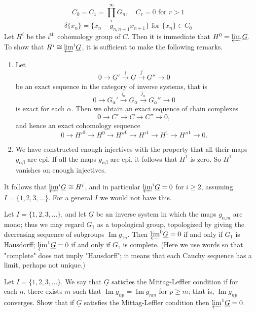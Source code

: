 \documentclass[../main]{subfiles}
\begin{document}
$$C_0=C_1=\prod_i^\infty G_n,\quad C_r=0 \text{ for } r>1 $$ 
$$\delta\{x_n\}=\{x_n-g_{n,n+1}x_{n+1}\} \text{ for } \{x_n\}\in C_0$$
Let $H^i$ be the $i^\text{th}$ cohomology group of $C$. Then it is immediate that $H^0=\varprojlim\underline{G}$. To show that $H^i\cong{\varprojlim}^i\underline{G}$, it is sufficient to make the following remarks.
\begin{enumerate}[wide=\parindent]
    \item Let $$0\longrightarrow \underline{G}'\overset{i}{\longrightarrow}\underline{G}\overset{j}{\longrightarrow}\underline{G}''\longrightarrow 0$$ be an exact sequence in the category of inverse systems, that is \\ $$0\longrightarrow G_\alpha'\overset{i_\alpha}{\longrightarrow}G_\alpha\overset{j_\alpha}{\longrightarrow}G_\alpha''\longrightarrow 0$$ is exact for each $\alpha$. Then we obtain an exact sequence of chain complexes
    $$0\longrightarrow C'\longrightarrow C\longrightarrow C'' \longrightarrow 0,$$
    and hence an exact cohomology sequence
    $$0\longrightarrow {H'}^0\longrightarrow H^0\longrightarrow {H''}^0 \longrightarrow {H'}^1 \longrightarrow H^1 \longrightarrow {H''}^1 \longrightarrow 0.$$
    \item We have constructed enough injectives with the property that all their maps $g_{\alpha\beta}$ are epi. If all the maps $g_{\alpha\beta}$ are epi, it follows that $H^1$ is zero. So $H^1$ vanishes on enough injectives.
\end{enumerate}
\par It follows that ${\varprojlim}^i \underline{G}\cong H^i$, and in particular ${\varprojlim}^i\underline{G}=0$ for $i\geq 2$, assuming $I=\{1,2,3,...\}$. For a general $I$ we would not have this.
\begin{exercise} \label{ex:p3ch08.i}
Let $I=\{1,2,3,...\}$, and let $\underline{G}$ be an inverse system in which the maps $g_{n.m}$ are mono; thus we may regard $G_1$ as a topological group, topologized by giving the decreasing sequence of subgroups $\operatorname{Im}g_{1n}$. Then ${\varprojlim}^0\underline{G}=0$ if and only if $G_1$ is Hausdorff; ${\varprojlim}^1\underline{G}=0$ if and only if $G_1$ is complete. (Here we use words so that "complete" does not imply "Hausdorff"; it means that each Cauchy sequence has a limit, perhaps not unique.)
\end{exercise}
\begin{exercise} \label{ex:p3ch08.ii}
Let $I=\{1,2,3,...\}$. We say that $\underline{G}$ satisfies the Mittag-Leffler condition if for each $n$, there exists $m$ such that $\operatorname{Im}g_{np}=\operatorname{Im}g_{nm}$ for $p\geq m$; that is, $\operatorname{Im}g_{np}$ converges. Show that if $\underline{G}$ satisfies the Mittag-Leffler condition then ${\varprojlim}^1\underline{G}=0$.
\end{exercise} 
\end{document}
